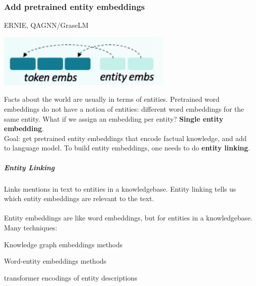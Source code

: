 \documentclass[10pt]{report}
\begin{document}
\subsubsection{Add pretrained entity embeddings} ERNIE, QAGNN/GraseLM
\begin{center}
	\includegraphics[scale=0.5]{106.png}
\end{center}
Facts about the world are usually in terms of entities. Pretrained word embeddings do not have a notion of entities: different word embeddings for the same entity. What if we assign an embedding per entity? \textbf{Single entity embedding}.\\
Goal: get pretrained entity embeddings that encode factual knowledge, and add to language model. To build entity embeddings, one needs to do \textbf{entity linking}.
\subparagraph{Entity Linking} Links mentions in text to entities in a knowledgebase. Entity linking tells us which entity embeddings are relevant to the text.\\\\
Entity embeddings are like word embeddings, but for entities in a knowledgebase. Many techniques:
\begin{list}{}{}
	\item Knowledge graph embeddings methods
	\item Word-entity embeddings methods
	\item transformer encodings of entity descriptions
\end{list}
\end{document}
